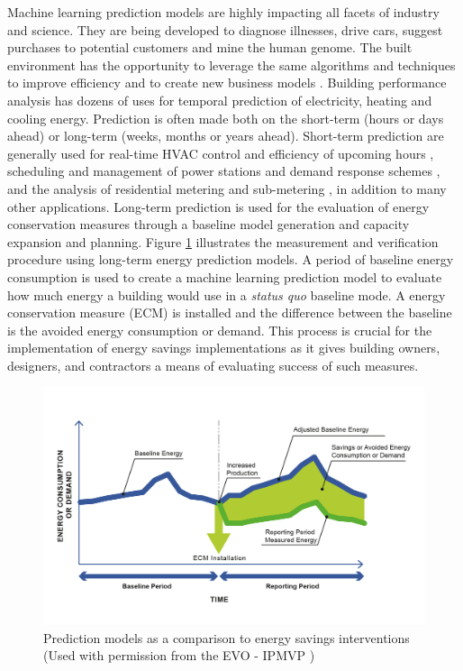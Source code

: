 \documentclass[preprint,12pt]{elsarticle}
\begin{document}
Machine learning prediction models are highly impacting all facets of industry and science. They are being developed to diagnose illnesses, drive cars, suggest purchases to potential customers and mine the human genome. The built environment has the opportunity to leverage the same  algorithms and techniques to improve efficiency and to create new business models \cite{agrawal2018prediction}. Building performance analysis has dozens of uses for temporal prediction of electricity, heating and cooling energy. Prediction is often made both on the short-term (hours or days ahead) or long-term (weeks, months or years ahead). Short-term prediction are generally used for real-time HVAC control and efficiency of upcoming hours \cite{Solomon2011ForecastingRegression, Fan2014DevelopmentTechniques}, scheduling and management of power stations and demand response schemes \cite{Borges2013AssessingBuildings, Escriva-Escriva2011NewEnd-uses, Jetcheva2014NeuralForecasts}, and the analysis of residential metering and sub-metering \cite{Jain2014ForecastingAccuracy}, in addition to many other applications. Long-term prediction is used for the evaluation of energy conservation measures through a baseline model generation \cite{Granderson2015AutomatedModels} and capacity expansion and planning. Figure \ref{fig:ipmvp} illustrates the measurement and verification procedure using long-term energy prediction models. A period of baseline energy consumption is used to create a machine learning prediction model to evaluate how much energy a building would use in a \emph{status quo} baseline mode. A energy conservation measure (ECM) is installed and the difference between the baseline is the avoided energy consumption or demand. This process is crucial for the implementation of energy savings implementations as it gives building owners, designers, and contractors a means of evaluating success of such measures.

\begin{figure}[ht!]
\begin{center}
\includegraphics[width=1\columnwidth]{figures/ipmvp.png}
\caption{Prediction models as a comparison to energy savings interventions (Used with permission from the EVO - IPMVP \cite{organisation2007international})}
\label{fig:ipmvp}%
\end{center}
\end{figure}
\end{document}
